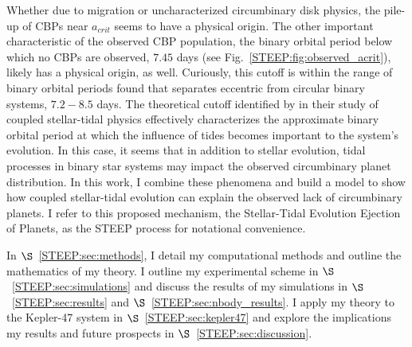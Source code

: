 Whether due to migration or uncharacterized circumbinary disk physics, the pile-up of CBPs near $a_{crit}$ seems to have a physical origin.  The other important characteristic of the observed \kepler CBP population, the binary orbital period below which no CBPs are observed, $7.45$ days (see Fig.~\ref{STEEP:fig:observed_acrit}), likely has a physical origin, as well.  Curiously, this cutoff is within the range of binary orbital periods \citet{Zahn1989} found that separates eccentric from circular binary systems, $7.2-8.5$ days.  The theoretical cutoff identified by \citet{Zahn1989} in their study of coupled stellar-tidal physics effectively characterizes the approximate binary orbital period at which the influence of tides becomes important to the system's evolution.  In this case, it seems that in addition to stellar evolution, tidal processes in binary star systems may impact the observed circumbinary planet distribution. In this work, I combine these phenomena and build a model to show how coupled stellar-tidal evolution can explain the observed lack of circumbinary planets. I refer to this proposed mechanism, the Stellar-Tidal Evolution Ejection of Planets, as the STEEP process for notational convenience. 

In $\S$~\ref{STEEP:sec:methods}, I detail my computational methods and outline the mathematics of my theory.  I outline my experimental scheme in $\S$~\ref{STEEP:sec:simulations} and discuss the results of my simulations in $\S$~\ref{STEEP:sec:results} and $\S$~\ref{STEEP:sec:nbody_results}.  I apply my theory to the Kepler-47 system in $\S$~\ref{STEEP:sec:kepler47} and explore the implications my results and future prospects in $\S$~\ref{STEEP:sec:discussion}.



